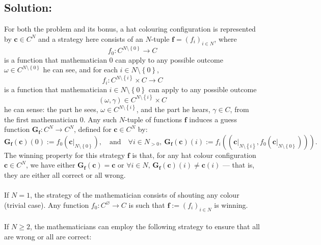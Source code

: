 \documentclass[11pt, a4paper, oneside]{article}
\newcommand{\solution}[1][]{\subsection*{#1}\hfill \par}
\theoremstyle{remark}
\theoremstyle{lemma}
\begin{document}
\solution[Solution:]
For both the problem and its bonus, a hat colouring configuration is represented by \( \mathbf{c} \in C^{N} \) and a strategy here consists of an $N$-tuple $\mathbf{f} = \left( f_i \right)_{i \in N}$, where
\[
f_0: C^{N \setminus \left\{ 0 \right\}} \to C
\]
is a function that mathematician $0$ can apply to any possible outcome \(\omega \in C^{N \setminus \left\{ 0 \right\}}\) he can see, and for each \(i \in N \setminus \left\{ 0 \right\}\),
\[
f_i: C^{N \setminus \left\{ i \right\}} \times C \to C
\]
is a function that mathematician \(i \in N \setminus \left\{ 0 \right\}\) can apply to any possible outcome
\[
\left( \omega, \gamma \right) \in C^{N \setminus \left\{ i \right\}} \times C
\]
he can sense: the part he sees, \(\omega \in C^{N \setminus \left\{ i \right\}}\), and the part he hears, \(\gamma \in C\), from the first mathematician \(0\). Any such \(N\)-tuple of functions \(\mathbf{f}\) induces a guess function \(\mathbf{G}_{\mathbf{f}}: C^N \to C^N\), defined for \(\mathbf{c} \in C^N\) by:
\[
\mathbf{G}_{\mathbf{f}}\left( \mathbf{c} \right)(0) := f_0 \left( \left. \mathbf{c} \right|_{N \setminus \left\{ 0 \right\}} \right), \quad \text{and} \quad \forall i \in N_{>0}, \ \mathbf{G}_{\mathbf{f}}\left( \mathbf{c} \right)(i) := f_i \left( \left( \left. \mathbf{c} \right|_{N \setminus \left\{ i \right\}}, f_0 \left( \left. \mathbf{c} \right|_{N \setminus \left\{ 0 \right\}} \right) \right) \right).
\]
The winning property for this strategy \(\mathbf{f}\) is that, for any hat colour configuration \(\mathbf{c} \in C^N\), we have either \(\mathbf{G}_{\mathbf{f}} \left( \mathbf{c} \right) = \mathbf{c}\) or \(\forall i \in N,\, \mathbf{G}_{\mathbf{f}} \left( \mathbf{c} \right)(i) \neq \mathbf{c}(i)\) — that is, they are either all correct or all wrong.
\\\\
If \(N = 1\), the strategy of the mathematician consists of shouting any colour (trivial case). Any function \(f_0: C^{\varnothing} \to C\) is such that \(\mathbf{f} := \left( f_i \right)_{i \in N}\) is winning.
\\\\
If \(N \geq 2\), the mathematicians can employ the following strategy to ensure that all are wrong or all are correct:
\\\\
\end{document}
